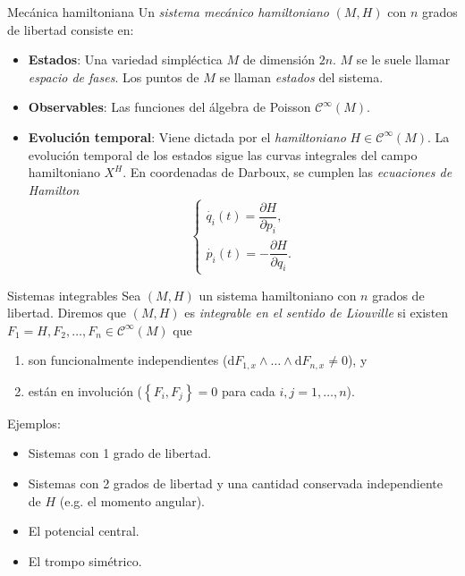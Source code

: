 \documentclass[mathserif]{beamer}
\newcommand{\dd}{\mathrm{d}}
\begin{document}
\begin{frame}{Mecánica hamiltoniana}
  Un \emph{sistema mecánico hamiltoniano} $(M,H)$ con $n$ grados de libertad consiste en:
  \begin{itemize}
    \item \textbf{Estados}: Una variedad simpléctica $M$ de dimensión $2n$. $M$ se le suele llamar \emph{espacio de fases}. Los puntos de $M$ se llaman \emph{estados} del sistema.
    \item \textbf{Observables}: Las funciones del álgebra de Poisson $\mathscr{C}^{\infty}(M)$.
    \item \textbf{Evolución temporal}: Viene dictada por el \emph{hamiltoniano} $H\in \mathscr{C}^{\infty}(M)$. La evolución temporal de los estados sigue las curvas integrales del campo hamiltoniano $X^H$. En coordenadas de Darboux, se cumplen las \emph{ecuaciones de Hamilton}
      \begin{equation*}
	\begin{cases}
	  \dot{q_i}(t)=\dfrac{\partial H}{\partial p_i}, \\[8 pt]
	  \dot{p_i}(t)=-\dfrac{\partial H}{\partial q_i}.
	\end{cases}
      \end{equation*}
  \end{itemize}
\end{frame}

\begin{frame}{Sistemas integrables}
  Sea $(M,H)$ un sistema hamiltoniano con $n$ grados de libertad. Diremos que $(M,H)$ es \emph{integrable en el sentido de Liouville} si existen $F_1=H,F_2,\dots,F_n \in \mathscr{C}^{\infty}(M)$ que
  \begin{enumerate}
    \item son funcionalmente independientes ($\dd F_{1,x}\wedge \dots \wedge \dd F_{n,x}\neq 0$), y
    \item están en involución ($\left\{ F_i,F_j \right\}=0$ para cada $i,j=1,\dots,n$).
  \end{enumerate}

  Ejemplos:
  \begin{itemize}
    \item Sistemas con 1 grado de libertad.
    \item Sistemas con 2 grados de libertad y una cantidad conservada independiente de $H$ (e.g. el momento angular).
    \item El potencial central.
    \item El trompo simétrico.
  \end{itemize}
\end{frame}
\end{document}
